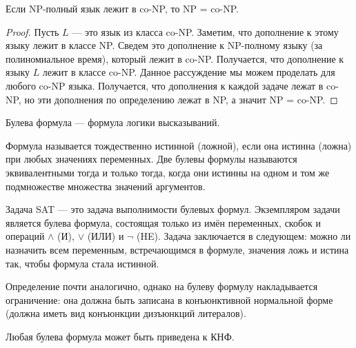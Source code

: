     \begin{Thm}
        Если NP-полный язык лежит в co-NP, то NP = co-NP.
    \end{Thm}
    
    \begin{proof}
        Пусть $L$ --- это язык из класса co-NP. Заметим, что дополнение к этому языку лежит в классе NP. Сведем это дополнение к NP-полному языку (за полиномиальное время), который лежит в co-NP. Получается, что дополнение к языку $L$ лежит в классе co-NP. Данное рассуждение мы можем проделать для любого co-NP языка. Получается, что дополнения к каждой задаче лежат в co-NP, но эти дополнения по определению лежат в NP, а значит NP = co-NP.
    \end{proof}

    
    
    \begin{Def}
        Булева формула --- формула логики высказываний.
    \end{Def}
    
    \begin{Rem}
        Формула называется тождественно истинной (ложной), если она истинна (ложна) при любых значениях переменных. Две булевы формулы называются эквивалентными тогда и только тогда, когда они истинны на одном и том же подмножестве множества значений аргументов.
    \end{Rem}
    
    \begin{Def}
        Задача SAT --- это задача выполнимости булевых формул. Экземпляром задачи является булева формула, состоящая только из имён переменных, скобок и операций  $\wedge$ (И), $\vee$ (ИЛИ) и $\neg$ (HE). Задача заключается в следующем: можно ли назначить всем переменным, встречающимся в формуле, значения ложь и истина так, чтобы формула стала истинной.
    \end{Def}
    
    \begin{Def}
        Определение почти аналогично, однако на булеву формулу накладывается ограничение: она должна быть записана в конъюнктивной нормальной форме (должна иметь вид конъюнкции дизъюнкций литералов).
    \end{Def}
    
    \begin{Rem}
        Любая булева формула может быть приведена к КНФ.
    \end{Rem}
    
